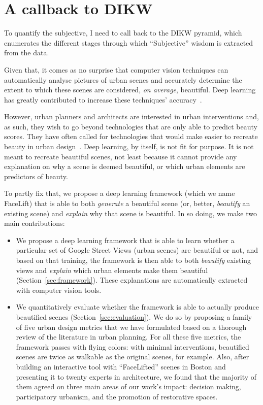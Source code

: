 \section{A callback to DIKW}

To quantify the subjective, I need to call back to the DIKW pyramid, which enumerates the different stages through which ``Subjective'' wisdom is extracted from the data.




Given that, it comes as no surprise that computer vision techniques can automatically analyse pictures of urban scenes and accurately determine the extent to which these scenes are considered, \emph{on average}, beautiful.  Deep learning has greatly contributed to increase these techniques' accuracy~\cite{dubey2016deep}.

However, urban planners and architects are interested in urban interventions and, as such, they wish to go beyond technologies that are only able to predict beauty scores. They have often called for technologies that would make easier to recreate beauty in urban design~\cite{de2008architecture}. Deep learning, by itself, is not fit for purpose. It is not meant to recreate beautiful scenes, not least because it cannot provide any explanation on why a scene is deemed beautiful, or which urban elements are predictors of beauty.


To partly fix that, we propose a deep learning framework (which we name  FaceLift) that is able to both \emph{generate} a beautiful scene (or, better, \emph{beautify} an existing scene) and \emph{explain} why that scene is beautiful. In so doing, we make two main contributions:

\begin{itemize}
    \item We propose a deep learning framework that is able to learn whether a particular set of Google Street Views (urban scenes) are beautiful or not, and based on that training, the framework is then able to both \emph{beautify} existing views and \emph{explain} which urban elements  make them beautiful (Section~\ref{sec:framework}). These explanations are automatically extracted with computer vision tools. 
    
    \item We quantitatively evaluate whether the framework is able to actually produce beautified scenes (Section~\ref{sec:evaluation}). We do so by proposing a family of five urban design metrics that we have formulated based on a thorough review of the literature in urban planning. For all these five metrics, the framework passes with flying colors: with minimal interventions, beautified scenes are twice as walkable as the original scenes, for example. Also, after building an interactive tool with ``FaceLifted'' scenes in Boston and presenting it to twenty experts in architecture,  we found that the majority of them agreed on three main areas of our work's impact: decision making, participatory urbanism, and the promotion of restorative spaces.
\end{itemize}



